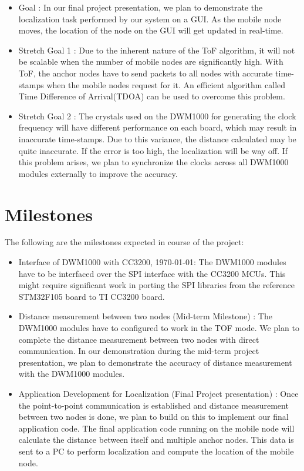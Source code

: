 \documentclass[journal,transmag]{IEEEtran}
\begin{document}
\begin{itemize}
    \item Goal : In our final project presentation, we plan to demonstrate the localization task performed by our system on a GUI. As the mobile node moves, the location of the node on the GUI will get updated in real-time.
    \item Stretch Goal 1 : Due to the inherent nature of the ToF algorithm, it will not be scalable when the number of mobile nodes are significantly high. With ToF, the anchor nodes have to send packets to all nodes with accurate time-stamps when the mobile nodes request for it. An efficient algorithm called Time Difference of Arrival(TDOA) can be used to overcome this problem. 
    \item Stretch Goal 2 : The crystals used on the DWM1000 for generating the clock frequency will have different performance on each board, which may result in inaccurate time-stamps. Due to this variance, the distance calculated may be quite inaccurate. If the error is too high, the localization will be way off. If this problem arises, we plan to synchronize the clocks across all DWM1000 modules externally to improve the accuracy.    
\end{itemize}
\section{Milestones}
The following are the milestones expected in course of the project:
\begin{itemize}
    \item Interface of DWM1000 with CC3200, \today : The DWM1000 modules have to be interfaced over the SPI interface with the CC3200 MCUs. This might require significant work in porting the SPI libraries from the reference STM32F105 board to TI CC3200 board.
    \item Distance measurement between two nodes (Mid-term Milestone) : The DWM1000 modules have to configured to work in the TOF mode. We plan to complete the distance measurement between two nodes with direct communication. In our demonstration during the mid-term project presentation, we plan to demonstrate the accuracy of distance measurement with the DWM1000 modules.
    \item Application Development for Localization (Final Project presentation) : Once the point-to-point communication is established and distance measurement between two nodes is done, we plan to build on this to implement our final application code. The final application code running on the mobile node will calculate the distance between itself and multiple anchor nodes. This data is sent to a PC to perform localization and compute the location of the mobile node. 

\end{itemize}
\end{document}

